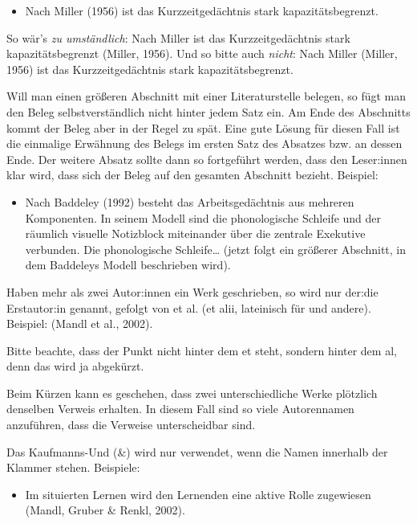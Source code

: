 \documentclass{../cssheet}
\begin{document}
\begin{itemize}
\item
  Nach Miller (1956) ist das Kurzzeitgedächtnis stark
  kapazitätsbegrenzt.
\end{itemize}

So wär's \emph{zu umständlich}: \glqq{}Nach Miller ist das Kurzzeitgedächtnis
stark kapazitätsbegrenzt (Miller, 1956).\grqq{} Und so bitte auch
\emph{nicht}: \glqq{}Nach Miller (Miller, 1956) ist das Kurzzeitgedächtnis
stark kapazitätsbegrenzt.\grqq{}

Will man einen größeren Abschnitt mit einer Literaturstelle belegen, so
fügt man den Beleg selbstverständlich nicht hinter jedem Satz ein. Am
Ende des Abschnitts kommt der Beleg aber in der Regel zu spät. Eine gute
Lösung für diesen Fall ist die einmalige Erwähnung des Belegs im ersten
Satz des Absatzes bzw. an dessen Ende. Der weitere Absatz sollte dann so
fortgeführt werden, dass den Leser:innen klar wird, dass sich der Beleg auf
den gesamten Abschnitt bezieht. Beispiel:

\begin{itemize}
\item
  Nach Baddeley (1992) besteht das Arbeitsgedächtnis aus mehreren
  Komponenten. In seinem Modell sind die phonologische Schleife und der
  räumlich visuelle Notizblock miteinander über die zentrale Exekutive
  verbunden. Die phonologische Schleife\ldots{} (jetzt folgt ein
  größerer Abschnitt, in dem Baddeleys Modell beschrieben wird).
\end{itemize}

Haben mehr als zwei Autor:innen ein Werk geschrieben,
so wird nur der:die Erstautor:in genannt, gefolgt von \glqq{}et al.\grqq{} (\glqq{}et alii\grqq{}, lateinisch
für \glqq{}und andere\grqq{}). Beispiel: (Mandl et al., 2002).

Bitte beachte, dass der Punkt nicht hinter dem \glqq{}et\grqq{} steht, sondern
hinter dem \glqq{}al\grqq{}, denn das wird ja abgekürzt.

Beim Kürzen kann es geschehen, dass zwei unterschiedliche Werke
plötzlich denselben Verweis erhalten. In diesem Fall sind so viele
Autorennamen anzuführen, dass die Verweise unterscheidbar sind.

Das Kaufmanns-Und (\&) wird nur verwendet, wenn die Namen innerhalb der
Klammer stehen. Beispiele:

\begin{itemize}
\item
  Im situierten Lernen wird den Lernenden eine aktive Rolle zugewiesen
  (Mandl, Gruber \& Renkl, 2002).
\end{itemize}
\end{document}
